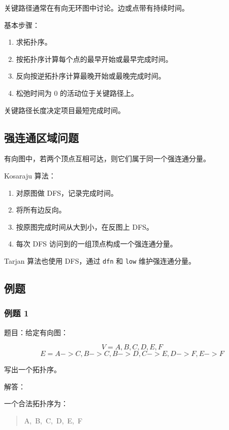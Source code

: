 \documentclass[UTF8,zihao=-4]{ctexart}
\begin{document}
关键路径通常在有向无环图中讨论。边或点带有持续时间。

基本步骤：

\begin{enumerate}
\item 求拓扑序。
\item 按拓扑序计算每个点的最早开始或最早完成时间。
\item 反向按逆拓扑序计算最晚开始或最晚完成时间。
\item 松弛时间为 0 的活动位于关键路径上。
\end{enumerate}

关键路径长度决定项目最短完成时间。

\subsection*{强连通区域问题}

有向图中，若两个顶点互相可达，则它们属于同一个强连通分量。

Kosaraju 算法：

\begin{enumerate}
\item 对原图做 DFS，记录完成时间。
\item 将所有边反向。
\item 按原图完成时间从大到小，在反图上 DFS。
\item 每次 DFS 访问到的一组顶点构成一个强连通分量。
\end{enumerate}

Tarjan 算法也使用 DFS，通过 \texttt{dfn} 和 \texttt{low} 维护强连通分量。

\subsection*{例题}

\subsubsection*{例题 1}

题目：给定有向图：

\[V = {A, B, C, D, E, F}\]
\[E = {A->C, B->C, B->D, C->E, D->F, E->F}\]

写出一个拓扑序。

解答：

一个合法拓扑序为：

\begin{quote}
\small\ttfamily\raggedright
\relax A,\ B,\ C,\ D,\ E,\ F\\
\end{quote}
\end{document}
